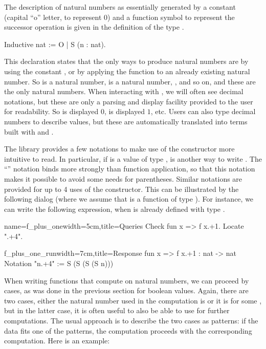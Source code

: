 The description of natural numbers as essentially generated by a
constant  (capital ``o'' letter, to represent $0$) and a function symbol  to represent 
the successor operation is given in the definition of the type
.

\begin{coq}{}{}
Inductive nat := O | S (n : nat).
\end{coq}

This declaration states that the only ways to produce natural numbers
are by using the constant , or by applying the function  to
an already existing natural number.  So  is a natural number,
 is a
natural number, , and so on, and these are the only natural
numbers.  When interacting with \Coq{}, we will often see decimal
notations, but these are only a parsing and display
facility provided to the user for readability.  So  is displayed
$0$,  is displayed $1$, etc.  Users can also type decimal
numbers to describe values, but these are automatically translated into
terms built with  and .

The \mcbMC{} library provides a few notations to make use of the
constructor  more intuitive to read.  In particular, if 
is a value of type ,  is another way to write .  The ``'' notation binds more strongly than function
application, so that this notation makes it possible to avoid some
needs for parentheses.
Similar notations are provided for up to 4 uses of the 
constructor.  This can be illustrated by the following dialog (where
we assume that  is a function of type ).
  For instance, we can write the following
expression, when  is already defined with type .

\begin{coq}{name=f_plus_one}{width=5cm,title=Queries}
Check fun x => f x.+1.
Locate ".+4".
\end{coq}
\begin{coqout}{f_plus_one_run}{width=7cm,title=Response}
fun x => f x.+1 : nat -> nat
Notation "n.+4" := S (S (S (S n)))
\end{coqout}

When writing functions that compute on natural numbers, we can
proceed by cases, as was done in the previous section for boolean
values.  Again, there are two cases, either the natural number used in
the computation is  or it is  for
some , but in the latter case, it is often useful to also be able
to use  for further computations.  The usual approach
is to describe the two cases as patterns: if the data fits one of
the patterns, the computation proceeds with the corresponding
computation.  Here is an example:


